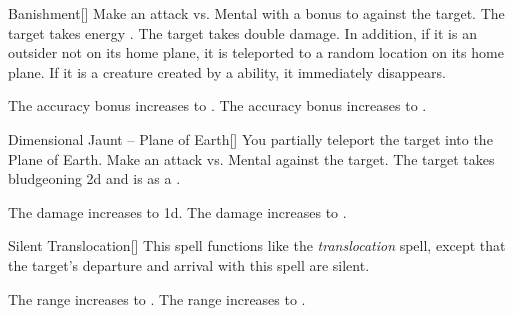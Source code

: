 \lowercase{\hypertarget{spell:Banishment}{}}\label{spell:Banishment}
\begin{freeability}[Rank 3]{\hypertarget{spell:Banishment}{Banishment}}[]
Make an attack vs. Mental with a  bonus to  against the target.
\hit The target takes energy .
\crit The target takes double damage.
In addition, if it is an outsider not on its home plane, it is teleported to a random location on its home plane.
If it is a creature created by a  ability, it immediately disappears.

\rankline
{} The accuracy bonus increases to .
 The accuracy bonus increases to .

\end{freeability}
\vspace{0.25em}



\lowercase{\hypertarget{spell:Dimensional Jaunt -- Plane of Earth}{}}\label{spell:Dimensional Jaunt -- Plane of Earth}
\begin{freeability}[Rank 3]{\hypertarget{spell:Dimensional Jaunt -- Plane of Earth}{Dimensional Jaunt -- Plane of Earth}}[]
You partially teleport the target into the Plane of Earth.
Make an attack vs. Mental against the target.
\hit The target takes bludgeoning  \minus2d and is  as a .

\rankline
{} The damage increases to  \minus1d.
 The damage increases to .

\end{freeability}
\vspace{0.25em}



\lowercase{\hypertarget{spell:Silent Translocation}{}}\label{spell:Silent Translocation}
\begin{freeability}[Rank 3]{\hypertarget{spell:Silent Translocation}{Silent Translocation}}[]
This spell functions like the \textit{translocation} spell, except that the target's departure and arrival with this spell are silent.

\rankline
{} The range increases to \rngmed.
 The range increases to \rnglong.

\end{freeability}
\vspace{0.25em}



